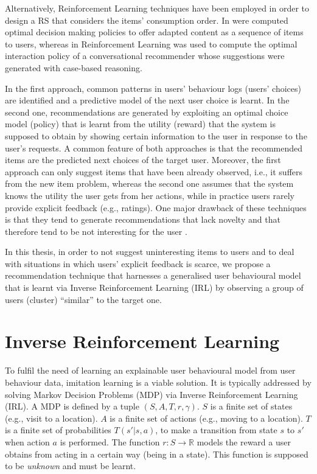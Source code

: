 Alternatively, Reinforcement Learning techniques have been employed in order to design a RS that considers the items' consumption order. In \cite{shani:RS:MDP:2005,moling:rl:seq} were computed optimal decision making policies to offer adapted content as a sequence of items to users, whereas in \cite{mahmood:seq:rl:2009} Reinforcement Learning was used to compute the optimal interaction policy of a conversational recommender whose suggestions were generated with case-based reasoning.

In the first approach, common patterns in users' behaviour logs (users' choices) are identified and a predictive model of the next user choice is learnt. In the second one, recommendations are generated by exploiting an optimal choice model (policy) that is learnt from the utility (reward) that the system is supposed to obtain by showing certain information to the user in response to the user's requests. A common feature of both approaches is that the recommended items are the predicted next choices of the target user. Moreover, the first approach can only suggest items that have been already observed, i.e., it suffers from the new item problem, whereas the second one assumes that the system knows the utility the user gets from her actions, while in practice users rarely provide explicit feedback (e.g., ratings). One major drawback of these techniques is that they tend to generate recommendations that lack novelty and that therefore tend to be not interesting for the user \cite{vargas2011}. \newline

In this thesis, in order to not suggest uninteresting items to users and to deal with situations in which users' explicit feedback is scarce, we propose a recommendation technique that harnesses a generalised user behavioural model that is learnt via Inverse Reinforcement Learning (IRL) by observing a group of users (cluster) ``similar'' to the target one.

\section{Inverse Reinforcement Learning}

To fulfil the need of learning an explainable user behavioural model from user behaviour data, imitation learning is a viable solution. It is typically addressed by solving Markov Decision Problems (MDP) via Inverse Reinforcement Learning (IRL)\cite{ng:2000}.
A MDP is defined by a tuple $(S,A,T,r,\gamma)$. $S$ is a finite set of states (e.g., visit to a location). $A$ is a finite set of actions (e.g., moving to a location). $T$ is a finite set of probabilities $T(s'| s, a)$, to make a transition from state $s$ to $s'$ when action $a$ is performed.
The function $r: S \rightarrow \mathbb{R}$ models the reward a user obtains from acting in a certain way (being in a state). This function is supposed to be {\it unknown} and must be learnt.


